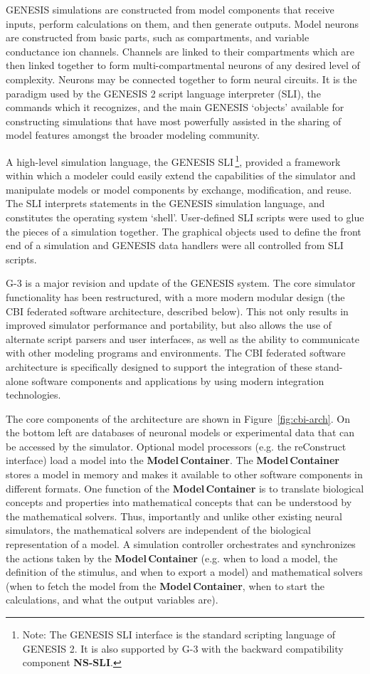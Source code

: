 \documentclass[12pt]{article}
\begin{document}
GENESIS simulations are constructed from model components that receive
inputs, perform calculations on them, and then generate outputs. Model
neurons are constructed from basic parts, such as compartments, and
variable conductance ion channels. Channels are linked to their
compartments which are then linked together to form
multi-compartmental neurons of any desired level of complexity.
Neurons may be connected together to form neural circuits.  It is the
paradigm used by the GENESIS 2 script language interpreter (SLI), the
commands which it recognizes, and the main GENESIS `objects' available
for constructing simulations that have most powerfully assisted in the
sharing of model features amongst the broader modeling community.

A high-level simulation language, the GENESIS SLI\,\footnote{Note: The
  GENESIS SLI interface is the standard scripting language of GENESIS
  2. It is also supported by G-3 with the backward compatibility
  component {\bf NS-SLI}.}, provided a framework within which a
modeler could easily extend the capabilities of
the simulator and manipulate models or model components by exchange, modification, and reuse. The SLI interprets statements in the
GENESIS simulation language, and constitutes the operating system
`shell'. User-defined SLI scripts were used to glue the pieces of a
simulation together. The graphical objects used to define the front
end of a simulation and GENESIS data handlers were all controlled from
SLI scripts.

G-3 is a major revision and update of the GENESIS system.  The core
simulator functionality has been restructured, with a more modern modular
design (the CBI federated software architecture, described below). This not
only results in improved simulator performance and portability, but
also allows the use of alternate script parsers and user interfaces,
as well as the ability to communicate with other modeling programs and
environments. The CBI federated software architecture is specifically designed
to support the integration of these stand-alone software components
and applications by using modern integration technologies.

The core components of the architecture are shown in
Figure~\ref{fig:cbi-arch}. On the bottom left are databases of
neuronal models or experimental data that can be accessed by the
simulator. Optional model processors (e.g. the reConstruct interface) load a model into the {\bf Model\,Container}.  The {\bf Model\,Container}
stores a model in memory and makes it available to other software
components in different formats.  One function of the {\bf Model\,Container}
is to translate biological concepts and properties into mathematical
concepts that can be understood by the mathematical solvers. Thus,
importantly and unlike other existing neural simulators, the
mathematical solvers are independent of the biological representation
of a model. A simulation controller orchestrates and synchronizes
the actions taken by the {\bf Model\,Container} (e.g. when to load a model,
the definition of the stimulus, and when to export a model) and
mathematical solvers (when to fetch the model from the {\bf Model\,Container}, when to start the calculations, and what the output
variables are).
\end{document}
